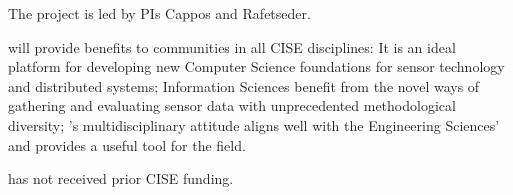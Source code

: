 The project is led by PIs Cappos and Rafetseder.

\sysname will provide benefits to communities in all CISE disciplines:
It is an ideal platform for developing new Computer Science
foundations for sensor technology and distributed systems;
Information Sciences benefit from the novel ways of gathering
and evaluating sensor data with unprecedented methodological
diversity; %
\sysname's multidisciplinary attitude aligns well with the
Engineering Sciences' and provides a useful tool for the field.

\sysname has not received prior CISE funding.